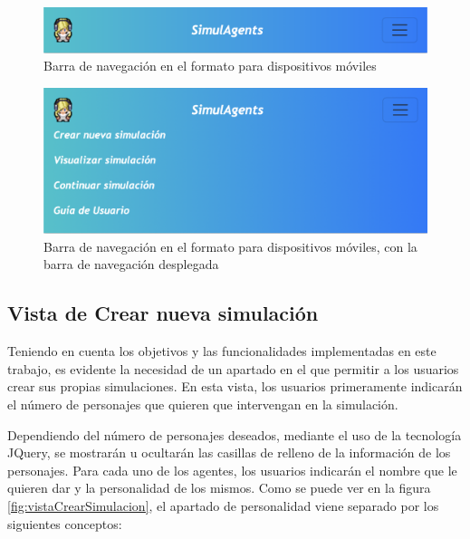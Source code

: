 \begin{figure}[h]
	\centering
	\includegraphics[width = 1\textwidth]{Imagenes/Vectorial/navBarMobile1.png}
	\caption{Barra de navegación en el formato para dispositivos móviles}
	\label{fig:navBarMobile1}
\end{figure}

\begin{figure}[h]
	\centering
	\includegraphics[width = 1\textwidth]{Imagenes/Vectorial/navBarMobile2.png}
	\caption{Barra de navegación en el formato para dispositivos móviles, con la barra de navegación desplegada}
	\label{fig:navBarMobile2}
\end{figure}

\subsection{Vista de Crear nueva simulación}

Teniendo en cuenta los objetivos y las funcionalidades implementadas en este trabajo, es evidente la necesidad de un apartado en el que permitir a los usuarios crear sus propias simulaciones. En esta vista, los usuarios primeramente indicarán el número de personajes que quieren que intervengan en la simulación.

Dependiendo del número de personajes deseados, mediante el uso de la tecnología JQuery, se mostrarán u ocultarán las casillas de relleno de la información de los personajes. Para cada uno de los agentes, los usuarios indicarán el nombre que le quieren dar y la personalidad de los mismos. Como se puede ver en la figura \ref{fig:vistaCrearSimulacion}, el apartado de personalidad viene separado por los siguientes conceptos:

